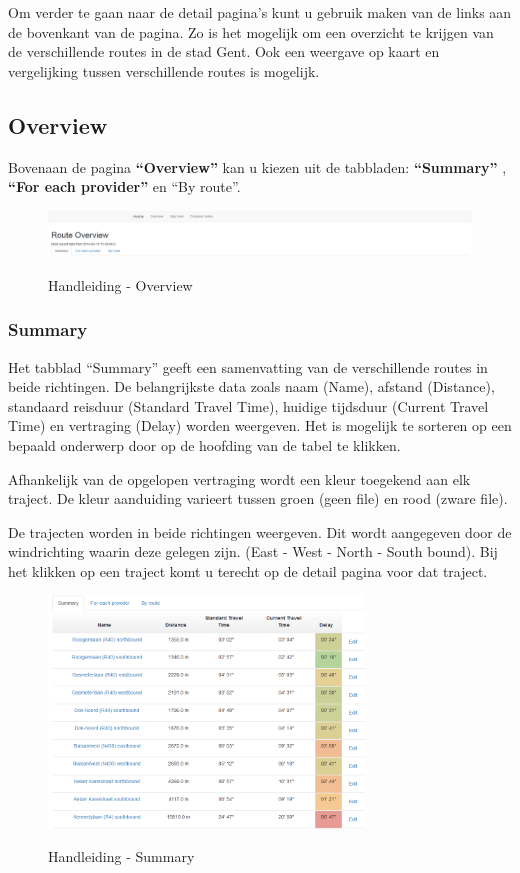 Om verder te gaan naar de detail pagina’s kunt u gebruik maken van de links aan de bovenkant van de pagina.
Zo is het mogelijk om een overzicht te krijgen van de verschillende routes in de stad Gent. Ook een weergave op kaart en vergelijking tussen verschillende routes is mogelijk.

\subsection{Overview}

Bovenaan de pagina \textbf{“Overview”} kan u kiezen uit de tabbladen: \textbf{“Summary”} , \textbf{“For each provider”} en “By route”.

\begin{figure}[H]
\centering
\includegraphics[width=\textwidth]{images/overview.png}\\
\caption{Handleiding - Overview}
\end{figure}

\subsubsection{Summary}

Het tabblad “Summary” geeft een samenvatting van de verschillende routes in beide richtingen. De belangrijkste data zoals naam (Name), afstand (Distance), standaard reisduur (Standard Travel Time), huidige tijdsduur (Current Travel Time) en vertraging (Delay) worden weergeven. Het is mogelijk te sorteren op een bepaald onderwerp door op de hoofding van de tabel te klikken. 

Afhankelijk van de opgelopen vertraging wordt een kleur toegekend aan elk traject. De kleur aanduiding varieert tussen groen (geen file) en rood (zware file).

De trajecten worden in beide richtingen weergeven. Dit wordt aangegeven door de windrichting waarin deze gelegen zijn. (East - West - North - South bound). Bij het klikken op een traject komt u terecht op de detail pagina voor dat traject.


\begin{figure}[H]
\centering
\includegraphics[width=0.75\textwidth]{images/summary.png}\\
\caption{Handleiding - Summary}
\end{figure}

